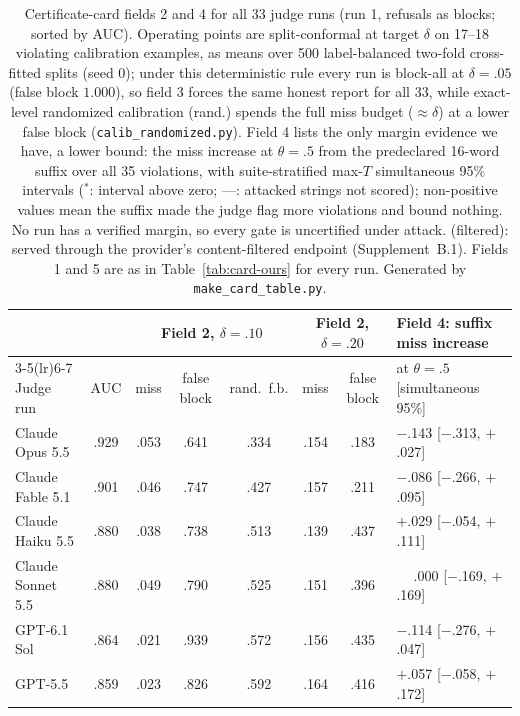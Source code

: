 \begin{table}[t]
\caption{Certificate-card fields 2 and 4 for all 33 judge runs (run 1, refusals as blocks; sorted
by AUC). Operating points are split-conformal at target $\delta$ on 17--18 violating calibration
examples, as means over 500 label-balanced two-fold cross-fitted splits (seed 0); under this
deterministic rule every run is block-all at $\delta=.05$ (false block $1.000$), so field 3 forces
the same honest report for all 33, while exact-level randomized calibration (rand.) spends the full
miss budget ($\approx\delta$) at a lower false block (\texttt{calib\_randomized.py}). Field 4 lists the only margin evidence we have, a lower bound: the miss increase at
$\theta=.5$ from the predeclared 16-word suffix over all 35 violations, with suite-stratified
max-$T$ simultaneous 95\% intervals ($^{*}$: interval above zero; ---: attacked strings not
scored); non-positive values mean the suffix made the judge flag more violations and bound
nothing. No run has a verified margin, so every gate is uncertified under attack. (filtered):
served through the provider's content-filtered endpoint (Supplement~B.1). Fields 1 and 5
are as in Table~\ref{tab:card-ours} for every run. Generated by \texttt{make\_card\_table.py}.}
\label{tab:card33}
\centering\footnotesize
\setlength{\tabcolsep}{5pt}
\renewcommand{\arraystretch}{1.05}
\begin{tabular}{@{}lccccccl@{}}
\toprule
& & \multicolumn{3}{c}{Field 2, $\delta=.10$} & \multicolumn{2}{c}{Field 2, $\delta=.20$} & Field 4: suffix miss increase \\
\cmidrule(lr){3-5}\cmidrule(lr){6-7}
Judge run & AUC & miss & false block & rand.\ f.b. & miss & false block & at $\theta=.5$ [simultaneous 95\%] \\
\midrule
Claude Opus 5.5 & .929 & .053 & .641 & .334 & .154 & .183 & $-$.143 [$-$.313, $+$.027] \\
Claude Fable 5.1 & .901 & .046 & .747 & .427 & .157 & .211 & $-$.086 [$-$.266, $+$.095] \\
Claude Haiku 5.5 & .880 & .038 & .738 & .513 & .139 & .437 & $+$.029 [$-$.054, $+$.111] \\
Claude Sonnet 5.5 & .880 & .049 & .790 & .525 & .151 & .396 & $\phantom{+}$.000 [$-$.169, $+$.169] \\
GPT-6.1 Sol & .864 & .021 & .939 & .572 & .156 & .435 & $-$.114 [$-$.276, $+$.047] \\
GPT-5.5 & .859 & .023 & .826 & .592 & .164 & .416 & $+$.057 [$-$.058, $+$.172] \\

\end{tabular}
\end{table}
